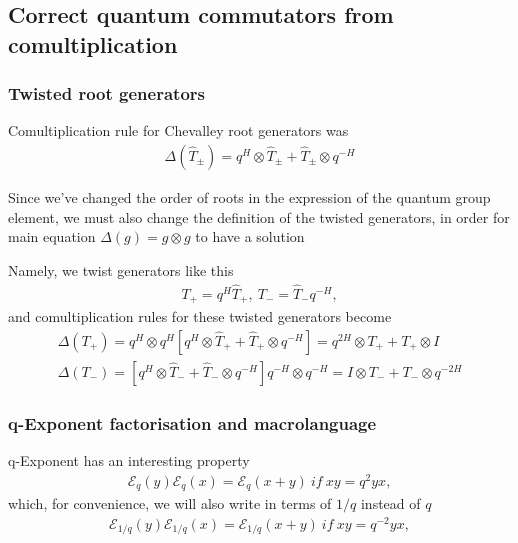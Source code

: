\documentclass{article}
\newcommand{\lb}{\left (}
\newcommand{\rb}{\right )}
\newcommand{\lsb}{\left [}
\newcommand{\rsb}{\right ]}
\newcommand{\be}{\begin{eqnarray}}
\newcommand{\ee}{\end{eqnarray}}
\newcommand {\?}{\textit{???}}
\newcommand{\me}[0]{\mathcal{E}}
\def\dg{\Delta (g)}
\def\gog{g \otimes g}
\newcommand{\matd}[4]{\lb \begin{array}{cc}
#1 & #2 \\ #3 & #4
\end{array} \rb}
\newcommand{\comul}[1]{\Delta \lb #1 \rb}
\newcommand{\delabel}[1]{(\ref{#1})}
\newcommand{\Honed}[1]{\lb \begin{array}{ccc}
#1^{1/2} & 0 \\ 0 & #1^{-1/2}
\end{array} \rb}
\newcommand{\Eoned}[1]{\lb \begin{array}{cc}
1 & #1 \\ 0 & 1
\end{array} \rb}
\newcommand{\Foned}[1]{\lb \begin{array}{cc}
1 & 0 \\ #1 & 1
\end{array} \rb}
\begin{document}



\subsection{Correct quantum commutators from comultiplication}

\subsubsection{Twisted root generators}
Comultiplication rule for Chevalley root generators was
\be
\comul{\hat{T}_\pm} = q^H \otimes \hat{T}_\pm + \hat{T}_\pm \otimes q^{-H}
\ee

Since we've changed the order of roots in the expression of the quantum group element, we must also change the
definition of the twisted generators, in order for main equation $\dg = \gog$ to have a solution

Namely, we twist generators like this
\be
T_+ = q^H \hat{T}_+,\ T_- = \hat{T}_- q^{-H},
\ee
and comultiplication rules for these twisted generators become
\be
\comul{T_+} = q^H \otimes q^H \lsb q^H \otimes \hat{T}_+ + \hat{T}_+ \otimes q^{-H} \rsb = q^{2H} \otimes T_+ + T_+ \otimes I \\
\comul{T_-} = \lsb q^H \otimes \hat{T}_- + \hat{T}_- \otimes q^{-H} \rsb q^{-H} \otimes q^{-H} = I \otimes T_- + T_- \otimes q^{-2H}
\ee

\subsubsection{q-Exponent factorisation and macrolanguage}
q-Exponent has an interesting property
\be
\me_q(y)\me_q(x) = \me_q(x + y)\ if\ xy = q^2 yx, \label{fact_q}
\ee
which, for convenience, we will also write in terms of $1/q$ instead of $q$
\be
\me_{1/q}(y)\me_{1/q}(x) = \me_{1/q}(x + y)\ if\ xy = q^{-2} yx, \label{fact_over_q}
\ee
\end{document}
